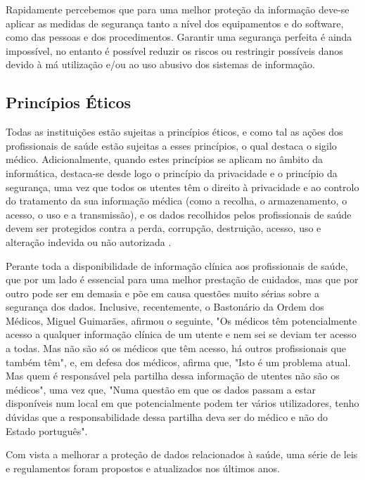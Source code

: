 \documentclass[conference]{IEEEtran}
\begin{document}
Rapidamente percebemos que para uma melhor proteção da informação deve-se aplicar as medidas de segurança tanto a nível dos equipamentos e do software, como das pessoas e dos procedimentos. Garantir uma segurança perfeita é ainda impossível, no entanto é possível reduzir os riscos ou restringir possíveis danos devido à má utilização e/ou ao uso abusivo dos sistemas de informação.


\subsection{Princípios Éticos} \label{princ_eticos}

Todas as instituições estão sujeitas a princípios éticos, e como tal as ações dos profissionais de saúde estão sujeitas a esses princípios, o qual  destaca o sigilo médico. Adicionalmente, quando estes princípios se aplicam no âmbito da informática, destaca-se desde logo o princípio da privacidade e o princípio da segurança, uma vez que todos os utentes têm o direito à privacidade e ao controlo do tratamento da sua informação médica (como a recolha, o armazenamento, o acesso, o uso e a transmissão), e os dados recolhidos pelos profissionais de saúde devem ser protegidos contra a perda, corrupção, destruição, acesso, uso e alteração indevida ou não autorizada \cite{segurancaSI}.

Perante toda a disponibilidade de informação clínica aos profissionais de saúde, que por um lado é essencial para uma melhor prestação de cuidados, mas que por outro pode ser em demasia e põe em causa questões muito sérias sobre a segurança dos dados. Inclusive, recentemente, o Bastonário da Ordem dos Médicos, Miguel Guimarães, afirmou o seguinte, "Os médicos têm potencialmente acesso a qualquer informação clínica de um utente e nem sei se deviam ter acesso a todas. Mas não são só os médicos que têm acesso, há outros profissionais que também têm", e, em defesa dos médicos, afirma que, "Isto é um problema atual. Mas quem é responsável pela partilha dessa informação de utentes não são os médicos", uma vez que, "Numa questão em que os dados passam a estar disponíveis num local em que potencialmente podem ter vários utilizadores, tenho dúvidas que a responsabilidade dessa partilha deva ser do médico e não do Estado português".

Com vista a melhorar a proteção de dados relacionados à saúde, uma série de leis e regulamentos foram propostos e atualizados nos últimos anos.
\end{document}
